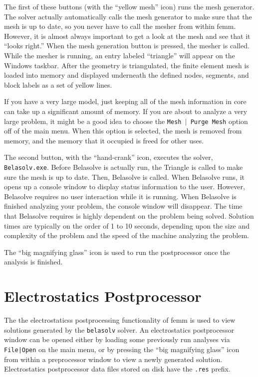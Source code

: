 \documentclass[12pt]{report}
\begin{document}
The first of these buttons (with the ``yellow mesh'' icon) runs the
mesh generator. The solver actually automatically calls the mesh
generator to make sure that the mesh is up to date, so you never
have to call the mesher from within femm. However, it is almost
always important to get a look at the mesh and see that it ``looks
right.'' When the mesh generation button is pressed, the mesher is
called. While the mesher is running, an entry labeled ``triangle''
will appear on the Windows taskbar. After the geometry is
triangulated, the finite element mesh is loaded into memory and
displayed underneath the defined nodes, segments, and block labels
as a set of yellow lines.

If you have a very large model, just keeping all of the mesh
information in core can take up a significant amount of memory. If
you are about to analyze a very large problem, it might be a good
idea to choose the \texttt{Mesh $\vert $ Purge Mesh} option off of
the main menu. When this option is selected, the mesh is removed
from memory, and the memory that it occupied is freed for other
uses.

The second button, with the ``hand-crank'' icon, executes the solver,
\texttt{Belasolv.exe}. Before Belasolve is actually run, the Triangle is
called to make sure the mesh is up to date. Then, Belasolve is called. When
Belasolve runs, it opens up a console window to display status information
to the user. However, Belasolve requires no user interaction while it is
running. When Belasolve is finished analyzing your problem, the console
window will disappear. The time that Belasolve requires is highly dependent
on the problem being solved. Solution times are typically on the order of 1
to 10 seconds, depending upon the size and complexity of the problem and the
speed of the machine analyzing the problem.

The ``big magnifying glass'' icon is used to run the postprocessor once the
analysis is finished.



\section{Electrostatics Postprocessor}


The the electrostaticss postprocessing functionality of femm is
used to view solutions generated by the {\tt belasolv} solver.  An
electrostatics postprocessor window can be opened either by loading
some previously run analyses via {\tt File|Open} on the main menu,
or by pressing the ``big magnifying glass'' icon from within a
preprocessor window to view a newly generated solution.
Electrostatics postprocessor data files stored on disk have the
{\tt .res} prefix.
\end{document}
